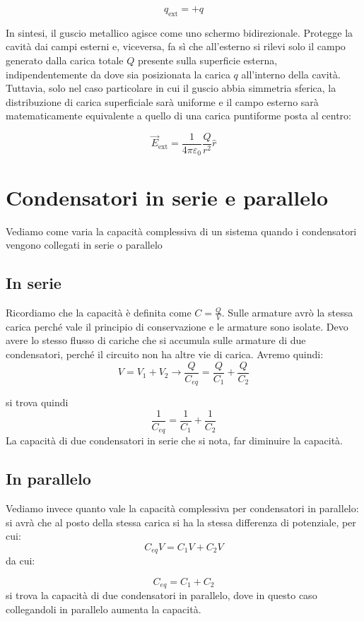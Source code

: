 \documentclass{book}
\begin{document}
\[
q_{\text{ext}} = +q
\]

In sintesi, il guscio metallico agisce come uno schermo bidirezionale. Protegge la cavità dai campi esterni e, viceversa, fa sì che all'esterno si rilevi solo il campo generato dalla carica totale $Q$ presente sulla superficie esterna, indipendentemente da dove sia posizionata la carica $q$ all'interno della cavità. Tuttavia, solo nel caso particolare in cui il guscio abbia simmetria sferica, la distribuzione di carica superficiale sarà uniforme e il campo esterno sarà matematicamente equivalente a quello di una carica puntiforme posta al centro:

\[
\vec{E}_{\text{ext}} = \frac{1}{4\pi\varepsilon_0} \frac{Q}{r^2} \hat{r}
\]


\section{Condensatori in serie e parallelo}

Vediamo come varia la capacità complessiva di un sistema quando i condensatori vengono collegati in serie o parallelo


\subsection{In serie}
Ricordiamo che la capacità è definita come $C=\frac{Q}{V}$. 
Sulle armature avrò la stessa carica perché vale il principio di conservazione e le armature sono isolate.
 Devo avere lo stesso flusso di cariche che si accumula sulle armature di due condensatori, perché il circuito non ha altre vie di carica.
 Avremo quindi: 
 $$V=V_1+V_2 \to \frac{Q}{C_{eq}} =  \frac{Q}{C_{1}} + \frac{Q}{C_{2}}$$

si trova quindi 
$$
\frac{1}{C_{eq}} =  \frac{1}{C_{1}} + \frac{1}{C_{2}}
$$
La capacità di due condensatori in serie che si nota, far diminuire la capacità.

\subsection{In parallelo}
Vediamo invece quanto vale la capacità complessiva per condensatori in parallelo:
si avrà che al posto della stessa carica si ha la stessa differenza di potenziale, per cui: 
$$C_{eq}V = C_{1}V + C_{2}V$$
da cui: 

$$C_{eq} = C_{1} + C_{2}$$
si trova la capacità di due condensatori in parallelo, dove in questo caso collegandoli in parallelo aumenta la capacità.
\end{document}
